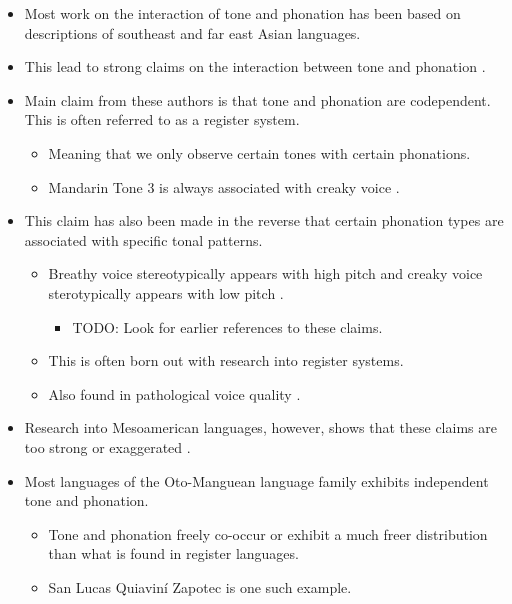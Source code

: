 \documentclass[12pt, letterpaper]{article}
\begin{document}
\begin{itemize}
	\item Most work on the interaction of tone and phonation has been based on descriptions of southeast and far east Asian languages.
	\item This lead to strong claims on the interaction between tone and phonation \citep{masicaDefiningLinguisticArea1976,thurgoodVietnameseTonogenesisRevising2002,yipTone2002,enfieldArealLinguisticsMainland2005,michaudComplexTonesEast2012,brunelleTonePhonationSoutheast2016}.
	\item Main claim from these authors is that tone and phonation are codependent. This is often referred to as a register system.  
	\begin{itemize}
		\item Meaning that we only observe certain tones with certain phonations. 
		\item Mandarin Tone 3 is always associated with creaky voice \citep{duanmuPhonologyStandardChinese2007}.
	\end{itemize}
	\item This claim has also been made in the reverse that certain phonation types are associated with specific tonal patterns. 
	\begin{itemize}
		\item Breathy voice stereotypically appears with high pitch and creaky voice sterotypically appears with low pitch \citep{eslingVoiceQualityLaryngeal2019}.
		\begin{itemize}
			\item TODO:\/\/ Look for earlier references to these claims. 
		\end{itemize}
		\item This is often born out with research into register systems. 
		\item Also found in pathological voice quality \citep{klattAnalysisSynthesisPerception1990,titzePrinciplesVoiceProduction2000,eslingVoiceQualityLaryngeal2019}.
	\end{itemize}
	\item Research into Mesoamerican languages, however, shows that these claims are too strong or exaggerated \citep{suarezMesoamericanIndianLanguages1983,campbellMesoAmericaLinguisticArea1986,silvermanLaryngealComplexityOtomanguean1997,dicanioPhoneticsPhonologySan2008,espositoVariationContrastivePhonation2010, campbellOtomangueanHistoricalLinguistics2017a,campbellOtomangueanHistoricalLinguistics2017}. 
	\item Most languages of the Oto-Manguean language family exhibits independent tone and phonation.
	\begin{itemize}
		\item Tone and phonation freely co-occur or exhibit a much freer distribution than what is found in register languages. 
		\item San Lucas Quiaviní Zapotec is one such example.
	\end{itemize}
\end{itemize}
\end{document}
